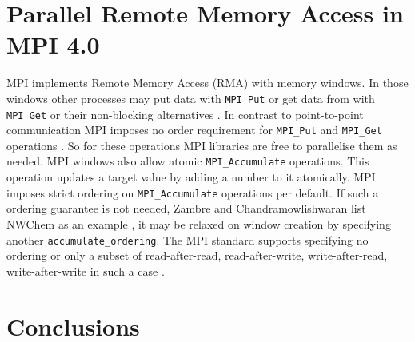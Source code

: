 \documentclass[sigconf]{acmart}
\begin{document}
\section{Parallel Remote Memory Access in MPI 4.0}

MPI implements Remote Memory Access (RMA) with memory windows.
In those windows other processes may put data with \verb|MPI_Put| or get data from with \verb|MPI_Get| or their non-blocking alternatives \cite{mpi40}.
In contrast to point-to-point communication MPI imposes no order requirement for \verb|MPI_Put| and \verb|MPI_Get| operations \cite{mpi40}.
So for these operations MPI libraries are free to parallelise them as needed.
MPI windows also allow atomic \verb|MPI_Accumulate| operations.
This operation updates a target value by adding a number to it atomically.
MPI imposes strict ordering on \verb|MPI_Accumulate| operations per default.
If such a ordering guarantee is not needed, Zambre and Chandramowlishwaran list NWChem as an example \cite{zambreLessonsLearned2022}, it may be relaxed on window creation by specifying another \verb|accumulate_ordering|.
The MPI standard supports specifying no ordering or only a subset of read-after-read, read-after-write, write-after-read, write-after-write in such a case \cite{mpi40}.

\section{Conclusions}


\end{document}
